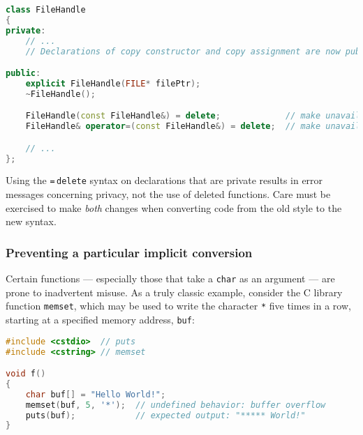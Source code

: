 %
%
%
\begin{lstlisting}[language=C++]
class FileHandle
{
private:
    // ...
    // Declarations of copy constructor and copy assignment are now public.

public:
    explicit FileHandle(FILE* filePtr);
    ~FileHandle();

    FileHandle(const FileHandle&) = delete;             // make unavailable
    FileHandle& operator=(const FileHandle&) = delete;  // make unavailable

    // ...
};
\end{lstlisting}

\noindent Using the \lstinline!=!\,\lstinline!delete! syntax on declarations that are private results in error messages concerning privacy, not the use of deleted functions. Care must be exercised to make \emph{both} changes when converting code from the old style to the new syntax.    

\subsubsection[Preventing a particular implicit conversion]{Preventing a particular implicit conversion}\label{preventing-a-particular-implicit-conversion}

Certain functions --- especially those that take a \lstinline!char! as an
argument --- are prone to inadvertent misuse. As a truly classic
example, consider the C library function \lstinline!memset!, which may be used
to write the character \lstinline!*! five times in a row, starting at a
specified memory address, \lstinline!buf!:

%
\begin{lstlisting}[language=C++]
#include <cstdio>  // puts
#include <cstring> // memset

void f()
{
    char buf[] = "Hello World!";
    memset(buf, 5, '*');  // undefined behavior: buffer overflow
    puts(buf);            // expected output: "***** World!"
}
\end{lstlisting}

